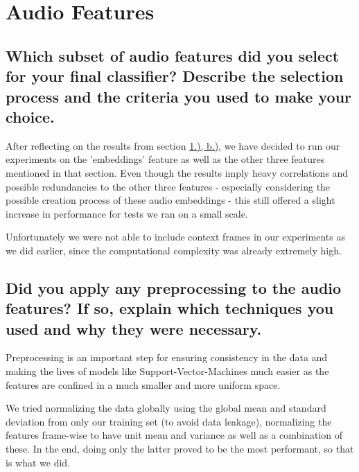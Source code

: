 
\section{Audio Features}
\label{sec:Audio Features}



\subsection{Which subset of audio features did you select for your final classifier? Describe the selection process and the criteria you used to make your choice.}
\label{sec:Audio Features:a}

After reflecting on the results from section \hyperref[sec:Labeling Function:b]{1.), b.)}, we have decided to run our experiments on the 'embeddings' feature as well as the other three features mentioned in that section. Even though the results imply heavy correlations and possible redundancies to the other three features - especially considering the possible creation process of these audio embeddings -  this still offered a slight increase in performance for tests we ran on a small scale.

Unfortunately we were not able to include context frames in our experiments as we did earlier, since the computational complexity was already extremely high.


\subsection{Did you apply any preprocessing to the audio features? If so, explain which techniques you used and why they were necessary.}
\label{sec:Audio Features:b}

Preprocessing is an important step for ensuring consistency in the data and making the lives of models like Support-Vector-Machines much easier as the features are confined in a much smaller and more uniform space. 

We tried normalizing the data globally using the global mean and standard deviation from only our training set (to avoid data leakage), normalizing the features frame-wise to have unit mean and variance as well as a combination of these. In the end, doing only the latter proved to be the most performant, so that is what we did.




